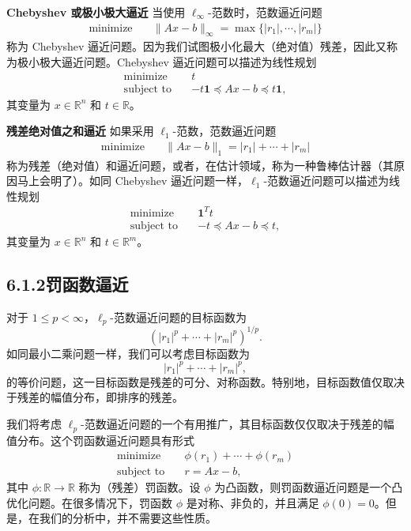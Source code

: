 \documentclass[UTF8, 12pt, fontset=fandol, oneside]{ctexart}
\begin{document}
\noindent\textbf{Chebyshev 或极小极大逼近}\quad
当使用 $\ell_\infty$-范数时，范数逼近问题
\[
\begin{aligned}
\text{minimize}\quad & \|Ax-b\|_\infty=\max\{|r_1|,\cdots,|r_m|\}
\end{aligned}
\]
称为 Chebyshev 逼近问题。因为我们试图极小化最大（绝对值）残差，因此又称为极小极大逼近问题。Chebyshev 逼近问题可以描述为线性规划
\[
\begin{aligned}
\text{minimize}\quad & t\\
\text{subject to}\quad & -t\mathbf{1}\preceq Ax-b\preceq t\mathbf{1},
\end{aligned}
\]
其变量为 $x\in\mathbb{R}^n$ 和 $t\in\mathbb{R}$。

\noindent\textbf{残差绝对值之和逼近}\quad
如果采用 $\ell_1$-范数，范数逼近问题
\[
\begin{aligned}
\text{minimize}\quad & \|Ax-b\|_1=|r_1|+\cdots+|r_m|
\end{aligned}
\]
称为残差（绝对值）和逼近问题，或者，在估计领域，称为一种鲁棒估计器（其原因马上会明了）。如同 Chebyshev 逼近问题一样，$\ell_1$-范数逼近问题可以描述为线性规划
\[
\begin{aligned}
\text{minimize}\quad & \mathbf{1}^Tt\\
\text{subject to}\quad & -t\preceq Ax-b\preceq t,
\end{aligned}
\]
其变量为 $x\in\mathbb{R}^n$ 和 $t\in\mathbb{R}^m$。

\subsection*{6.1.2\quad 罚函数逼近}

对于 $1\leq p<\infty$，$\ell_p$-范数逼近问题的目标函数为
\[
\left(|r_1|^p+\cdots+|r_m|^p\right)^{1/p}.
\]
如同最小二乘问题一样，我们可以考虑目标函数为
\[
|r_1|^p+\cdots+|r_m|^p,
\]
的等价问题，这一目标函数是残差的可分、对称函数。特别地，目标函数值仅取决于残差的幅值分布，即排序的残差。

我们将考虑 $\ell_p$-范数逼近问题的一个有用推广，其目标函数仅仅取决于残差的幅值分布。这个罚函数逼近问题具有形式
\begin{equation}
\begin{aligned}
\text{minimize}\quad & \phi(r_1)+\cdots+\phi(r_m)\\
\text{subject to}\quad & r=Ax-b,
\end{aligned}
\tag{6.2}
\end{equation}
其中 $\phi:\mathbb{R}\to\mathbb{R}$ 称为（残差）罚函数。设 $\phi$ 为凸函数，则罚函数逼近问题是一个凸优化问题。在很多情况下，罚函数 $\phi$ 是对称、非负的，并且满足 $\phi(0)=0$。但是，在我们的分析中，并不需要这些性质。
\end{document}
